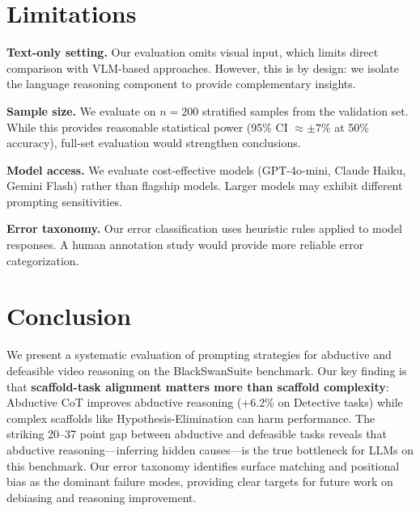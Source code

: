 \documentclass[10pt,twocolumn,letterpaper]{article}
\begin{document}
\section{Limitations}
\label{sec:limitations}

\textbf{Text-only setting.} Our evaluation omits visual input, which limits direct comparison with VLM-based approaches. However, this is by design: we isolate the language reasoning component to provide complementary insights.

\textbf{Sample size.} We evaluate on $n=200$ stratified samples from the validation set. While this provides reasonable statistical power (95\% CI $\approx \pm 7\%$ at 50\% accuracy), full-set evaluation would strengthen conclusions.

\textbf{Model access.} We evaluate cost-effective models (GPT-4o-mini, Claude Haiku, Gemini Flash) rather than flagship models. Larger models may exhibit different prompting sensitivities.

\textbf{Error taxonomy.} Our error classification uses heuristic rules applied to model responses. A human annotation study would provide more reliable error categorization.

\section{Conclusion}
\label{sec:conclusion}

We present a systematic evaluation of prompting strategies for abductive and defeasible video reasoning on the BlackSwanSuite benchmark. Our key finding is that \textbf{scaffold-task alignment matters more than scaffold complexity}: Abductive CoT improves abductive reasoning (+6.2\% on Detective tasks) while complex scaffolds like Hypothesis-Elimination can harm performance. The striking 20--37 point gap between abductive and defeasible tasks reveals that abductive reasoning---inferring hidden causes---is the true bottleneck for LLMs on this benchmark. Our error taxonomy identifies surface matching and positional bias as the dominant failure modes, providing clear targets for future work on debiasing and reasoning improvement.

{\small


}
\end{document}
